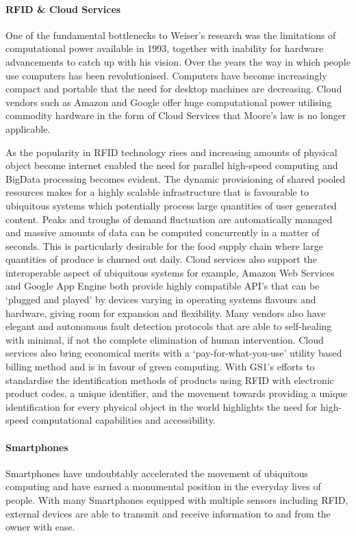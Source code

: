 \documentclass[a4paper, 11pt]{article}
\begin{document}
\paragraph{RFID \& Cloud Services}One of the fundamental bottlenecks to Weiser's research was the limitations of computational power available in 1993\cite{weiserLimit}, together with inability for hardware advancements to catch up with his vision. Over the years the way in which people use computers has been revolutionised. Computers have become increasingly compact and portable that the need for desktop machines are decreasing. Cloud vendors such as Amazon and Google offer huge computational power utilising commodity hardware in the form of Cloud Services that Moore's law is no longer applicable\cite{HadoopInAction}. 

As the popularity in RFID technology rises and increasing amounts of physical object become internet enabled the need for parallel high-speed computing and BigData processing becomes evident. The dynamic provisioning of shared pooled resources makes for a highly scalable infrastructure that is favourable to ubiquitous systems which potentially process large quantities of user generated content. Peaks and troughs of demand fluctuation are automatically managed and massive amounts of data can be computed concurrently in a matter of seconds. This is particularly desirable for the food supply chain where large quantities of produce is churned out daily. Cloud services also support the interoperable aspect of ubiquitous systems for example, Amazon Web Services and Google App Engine both provide highly compatible API's that can be `plugged and played' by devices varying in operating systems flavours and hardware, giving room for expansion and flexibility. Many vendors also have elegant and autonomous fault detection protocols that are able to self-healing with minimal, if not the complete elimination of human intervention. Cloud services also bring economical merits with a `pay-for-what-you-use' utility based billing method and is in favour of green computing.\cite{CAYS} With GS1's efforts to standardise the identification methods of products using RFID with electronic product codes, a unique identifier, and the movement towards providing a unique identification for every physical object in the world highlights the need for high-speed computational capabilities and accessibility.\cite{GS1}

\paragraph{Smartphones}Smartphones have undoubtably accelerated the movement of ubiquitous computing and have earned a monumental position in the everyday lives of people. With many Smartphones equipped with multiple sensors including RFID, external devices are able to transmit and receive information to and from the owner with ease. 
\end{document}
